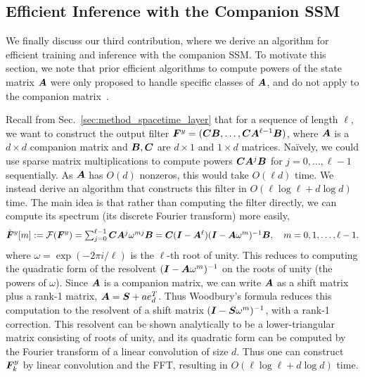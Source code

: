 %
\subsection{Efficient Inference with the Companion SSM}
\label{sec:efficient_algorithm}

We finally discuss our third contribution, where we derive an algorithm for efficient training and inference with the companion SSM.
To motivate this section, we note that prior efficient algorithms to compute powers of the state matrix $\boldsymbol{A}$ were only proposed to handle specific classes of $\boldsymbol{A}$, and do not apply to the companion matrix~\citep{gu2021efficiently, goel2022s, gu2022parameterization}. 


Recall from Sec.~\ref{sec:method_spacetime_layer} that 
for a sequence of length $\ell$, we want to construct the output filter
$\boldsymbol{F}^y = (\boldsymbol{C} \boldsymbol{B}, \dots, \boldsymbol{C}\boldsymbol{A}^{\ell-1}\boldsymbol{B})$, where $\boldsymbol{A}$ is a $d \times d$
companion matrix and $\boldsymbol{B}, \boldsymbol{C}$ are $d \times 1$ and $1 \times d$ matrices.
%
Na\"ively, we could use sparse matrix multiplications to compute powers $\boldsymbol{C} \boldsymbol{A}^j \boldsymbol{B}$ for $j=0, \dots, \ell-1$ sequentially. As $\boldsymbol{A}$ has $O(d)$
nonzeros, this would take $O(\ell d)$ time. 
We instead derive an algorithm that constructs this filter in $O(\ell \log \ell + d \log d)$
time.
The main idea is that rather than computing the filter directly, we can compute its spectrum (its discrete Fourier transform) more easily, \ie{} 
\begin{equation*}
  \tilde{\boldsymbol{F}}^y[m] := {\cal F}(\boldsymbol{F}^y) = \textstyle \sum_{j=0}^{\ell-1} \boldsymbol{C} \boldsymbol{A}^j \omega^{mj} \boldsymbol{B} = \boldsymbol{C}(\boldsymbol{I} - \boldsymbol{A}^\ell) (\boldsymbol{I} - \boldsymbol{A} \omega^m)^{-1} \boldsymbol{B},
  \quad m = 0, 1, \dots, \ell-1.
\end{equation*}
where $\omega = \exp(-2\pi i / \ell)$ is the $\ell$-th root of unity.
This reduces to computing the quadratic form of the resolvent $(\boldsymbol{I} - \boldsymbol{A} \omega^m)^{-1}$
on the roots of unity (the powers of $\omega$).
Since $\boldsymbol{A}$ is a companion matrix, we can write $\boldsymbol{A}$ as a shift matrix plus a
rank-1 matrix, $\boldsymbol{A} = \boldsymbol{S} + a e_d^T$.
Thus Woodbury's formula reduces this computation to the resolvent of a shift
matrix $(\boldsymbol{I} - \boldsymbol{S} \omega^m)^{-1}$, with a rank-1 correction.
This resolvent can be shown analytically to be a
lower-triangular matrix consisting of roots of unity, and its quadratic form can
be computed by the Fourier transform of a linear convolution of size $d$.
Thus one can construct $\boldsymbol{F}_k^y$ by linear convolution and the FFT, resulting in $O(\ell \log \ell + d\log d)$ time.
%

